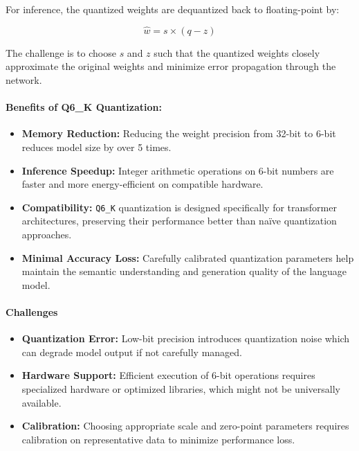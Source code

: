For inference, the quantized weights are dequantized back to floating-point by:

\begin{equation*}
\hat{w} = s \times (q - z)
\end{equation*}

The challenge is to choose $s$ and $z$ such that the quantized weights closely approximate the original weights and minimize error propagation through the network.

\paragraph{Benefits of Q6\_K Quantization:}
\begin{itemize}
    \item \textbf{Memory Reduction:} Reducing the weight precision from 32-bit to 6-bit reduces model size by over 5 times.
    
    \item \textbf{Inference Speedup:} Integer arithmetic operations on 6-bit numbers are faster and more energy-efficient on compatible hardware.
    
    \item \textbf{Compatibility:} \texttt{Q6\_K} quantization is designed specifically for transformer architectures, preserving their performance better than naïve quantization approaches.
    
    \item \textbf{Minimal Accuracy Loss:} Carefully calibrated quantization parameters help maintain the semantic understanding and generation quality of the language model.
\end{itemize}

\paragraph{Challenges}
\begin{itemize}
    \item \textbf{Quantization Error:} Low-bit precision introduces quantization noise which can degrade model output if not carefully managed.
    
    \item \textbf{Hardware Support:} Efficient execution of 6-bit operations requires specialized hardware or optimized libraries, which might not be universally available.
    
    \item \textbf{Calibration:} Choosing appropriate scale and zero-point parameters requires calibration on representative data to minimize performance loss.
\end{itemize}

